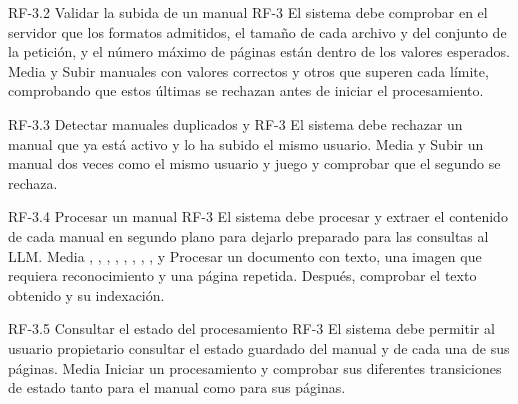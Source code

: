 \requisitoFuncional
{RF-3.2}
{Validar la subida de un manual}
{}
{RF-3}
{El sistema debe comprobar en el servidor que los formatos admitidos, el tamaño de
cada archivo y del conjunto de la petición, y el número máximo de páginas
están dentro de los valores esperados.}
{Media}
{ y }
{Subir manuales con valores correctos y otros que superen cada límite,
comprobando que estos últimas se rechazan antes de iniciar el procesamiento.}

\requisitoFuncional
{RF-3.3}
{Detectar manuales duplicados}
{ y }
{RF-3}
{El sistema debe rechazar un manual que ya está activo y lo ha subido
el mismo usuario.}
{Media}
{ y }
{Subir un manual dos veces como el mismo usuario y juego y comprobar que  el segundo se rechaza.}



\requisitoFuncional
{RF-3.4}
{Procesar un manual}
{}
{RF-3}
{El sistema debe procesar y extraer el contenido de cada manual en segundo
plano para dejarlo preparado para las consultas al \ac{LLM}.
}
{Media}
{, , ,
, , ,
, ,  y
}
{Procesar un documento con texto, una imagen que requiera reconocimiento y una
página repetida. Después, comprobar el texto obtenido y su indexación.}


\requisitoFuncional
{RF-3.5}
{Consultar el estado del procesamiento}
{}
{RF-3}
{El sistema debe permitir al usuario propietario consultar el estado guardado del
manual y de cada una de sus páginas.}
{Media}
{}
{Iniciar un procesamiento y comprobar sus diferentes transiciones de estado
tanto para el manual como para sus páginas.}

